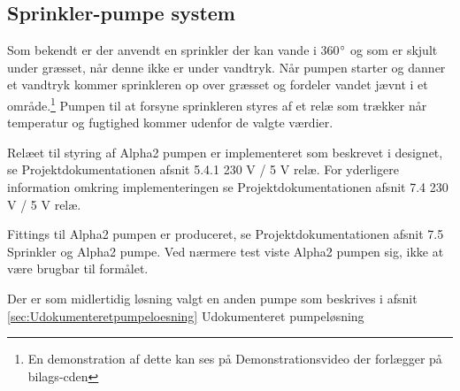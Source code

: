 \subsection{Sprinkler-pumpe system}
Som bekendt er der anvendt en sprinkler der kan vande i 360$^{\circ}$ og som er skjult under græsset, når denne ikke er under vandtryk. Når pumpen starter og danner et vandtryk kommer sprinkleren op over græsset og fordeler vandet jævnt i et område.\footnote{En demonstration af dette kan ses på Demonstrationsvideo der forlægger på bilags-cden}
Pumpen til at forsyne sprinkleren styres af et relæ som trækker når temperatur og fugtighed kommer udenfor de valgte værdier.

Relæet til styring af Alpha2 pumpen er implementeret som beskrevet i designet, se Projektdokumentationen afsnit 5.4.1 230 V / 5 V relæ. For yderligere information omkring implementeringen se Projektdokumentationen afsnit 7.4 230 V / 5 V relæ. 

Fittings til Alpha2 pumpen er produceret, se Projektdokumentationen afsnit 7.5 Sprinkler og Alpha2 pumpe. Ved nærmere test viste Alpha2 pumpen sig, ikke at være brugbar til formålet.  

Der er som midlertidig løsning valgt en anden pumpe som beskrives i afsnit \ref{sec:Udokumenteretpumpeloesning} Udokumenteret pumpeløsning